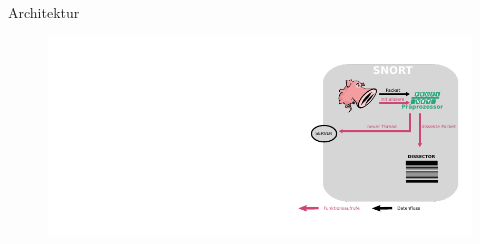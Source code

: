 \begin{frame}{Architektur}
    \begin{figure}
    	\centering
    	\includegraphics[width=\textwidth]{./images/5.pdf}
    \end{figure}
\end{frame}
